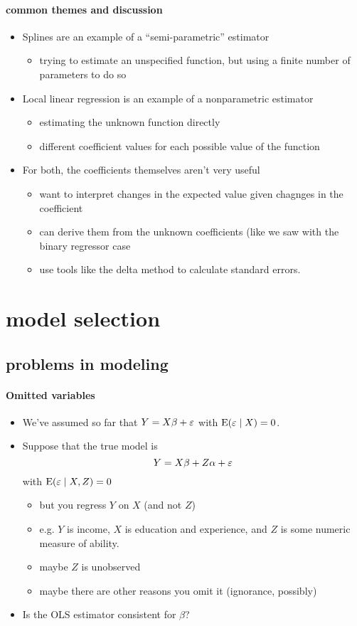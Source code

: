 \paragraph{common themes and discussion}
\begin{itemize}
\item Splines are an example of a ``semi-parametric'' estimator
\begin{itemize}
\item trying to estimate an unspecified function, but using a
          finite number of parameters to do so
\end{itemize}
\item Local linear regression is an example of a nonparametric estimator
\begin{itemize}
\item estimating the unknown function directly
\item different coefficient values for each possible value of the
          function
\end{itemize}
\item For both, the coefficients themselves aren't very useful
\begin{itemize}
\item want to interpret changes in the expected value given
          chagnges in the coefficient
\item can derive them from the unknown coefficients (like we saw
          with the binary regressor case
\item use tools like the delta method to calculate standard errors.
\end{itemize}
\end{itemize}

\section{model selection}
\subsection{problems in modeling}

\paragraph{Omitted variables}
\begin{itemize}
\item We've assumed so far that $Y = X\beta + \varepsilon$ with $\operatorname{E}(\varepsilon \mid X) = 0$.
\item Suppose that the true model is
  \[Y = X\beta + Z\alpha + \varepsilon\] with $\operatorname{E}(\varepsilon \mid X, Z) = 0$
\begin{itemize}
\item but you regress $Y$ on $X$ (and not $Z$)
\item e.g. $Y$ is income, $X$ is education and experience, and
          $Z$ is some numeric measure of ability.
\item maybe $Z$ is unobserved
\item maybe there are other reasons you omit it (ignorance, possibly)
\end{itemize}
\item Is the OLS estimator consistent for $\beta$?
\end{itemize}

